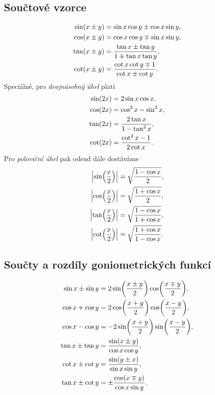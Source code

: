 \documentclass[columns=2]{cheatsheet}
\begin{document}
\subsection{Součtové vzorce}
\setlength{\jot}{4.25pt}  %
\setlength{\belowdisplayskip}{9pt}  %
\begin{align*}
  \sin \parens{x \pm y} 
  &= 
  \sin x \cos y \pm \cos x \sin y,
  \\
  \cos \parens{x \pm y} 
  &=
  \cos x \cos y \mp \sin x \sin y,
  \\
  \tan \parens{x \pm y} 
  &=
  \frac{\tan x \pm \tan y}{1 \mp \tan x \tan y},
  \\
  \cot \parens{x \pm y} 
  &=
  \frac{\cot x \cot y \mp 1}{\cot x \pm \cot y}.
\end{align*}
Speciálně, pro \emph{dvojnásobný úhel} platí
\begin{align*}
  \sin \parens{2x}
  &= 
  2 \sin x \cos x,
  \\
  \cos \parens{2x}
  &= 
  \cos^2 x - \sin^2 x,
  \\
  \tan \parens{2x}
  &= 
  \frac{2 \tan x}{1 - \tan^2 x},
  \\
  \cot \parens{2x}
  &=
  \frac{\cot^2 x - 1}{2 \cot x}.
\end{align*}
Pro \emph{poloviční úhel} pak odsud dále dostáváme
\begin{align*}
  \abs{\sin \parens{\frac{x}{2}}}
  &= 
  \sqrt{\frac{1 - \cos x}{2}},
  \\
  \abs{\cos \parens{\frac{x}{2}}}
  &= 
  \sqrt{\frac{1 + \cos x}{2}},
  \\
  \abs{\tan \parens{\frac{x}{2}}}
  &= 
  \sqrt{\frac{1 - \cos x}{1 + \cos x}},
  \\
  \abs{\cot \parens{\frac{x}{2}}}
  &= 
  \sqrt{\frac{1 + \cos x}{1 - \cos x}}.
\end{align*}

\vfill\null\columnbreak

\subsection{Součty a rozdíly goniometrických funkcí}
\setlength{\abovedisplayskip}{6pt}  %
\begin{align*}
  \sin x \pm \sin y 
  &= 
  2 \sin \parens{\frac{x \pm y}{2}} \cos \parens{\frac{x \mp y}{2}},
  \\
  \cos x + \cos y 
  &= 
  2 \cos \parens{\frac{x + y}{2}} \cos \parens{\frac{x - y}{2}},
  \\
  \cos x - \cos y 
  &= 
  - 2 \sin \parens{\frac{x + y}{2}} \sin \parens{\frac{x - y}{2}},
  \\
  \tan x \pm \tan y 
  &=
  \frac{\sin \parens{x \pm y}}{\cos x \cos y},
  \\
  \cot x \pm \cot y
  &=
  \frac{\sin \parens{y \pm x}}{\sin x \sin y},
  \\
  \tan x \pm \cot y
  &=
  \pm \frac{\cos \parens{x \mp y}}{\cos x \sin y}.
\end{align*}
\end{document}
